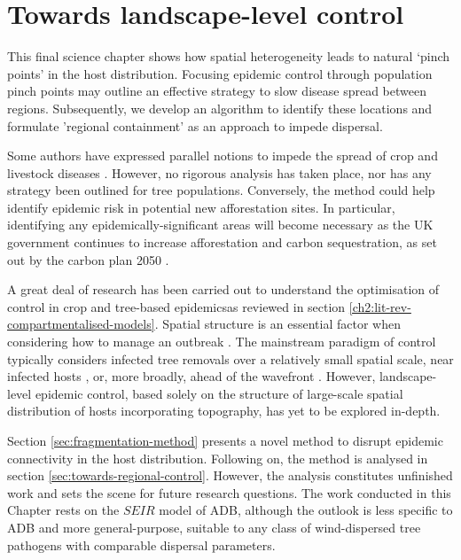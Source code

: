 
\chapter{Towards landscape-level control}

\label{ch7:landscape-level-control}

This final science chapter shows how spatial heterogeneity leads to natural `pinch points' in the host distribution. Focusing epidemic control through population pinch points may outline an effective strategy to slow disease spread between regions. Subsequently, we develop an algorithm to identify these locations and formulate 'regional containment' as an approach to impede dispersal.

Some authors have expressed parallel notions to impede the spread of crop and livestock diseases \cite{PAPAIX201435, GILIOLI20131, Gilligan-disease-management}. However, no rigorous analysis has taken place, nor has any strategy been outlined for tree populations. Conversely, the method could help identify epidemic risk in potential new afforestation sites. In particular, identifying any epidemically-significant areas will become necessary as the UK government continues to increase afforestation and carbon sequestration, as set out by the carbon plan 2050 \cite{tol2021europe, konadu2015land}.

A great deal of research has been carried out to understand the optimisation of control in crop and tree-based epidemics\textemdash as reviewed in section \ref{ch2:lit-rev-compartmentalised-models}. 
Spatial structure is an essential factor when considering how to manage an outbreak \cite{spatial-control-optimisation, control-heterogeneous-landscapes}. 
The mainstream paradigm of control typically considers infected tree removals over a relatively small spatial scale, near infected hosts \cite{WEBIDEMICS}, or, more broadly, ahead of the wavefront \cite{large-scale-control}. 
However, landscape-level epidemic control, based solely on the structure of large-scale spatial distribution of hosts incorporating topography, has yet to be explored in-depth.

Section \ref{sec:fragmentation-method} presents a novel method to disrupt epidemic connectivity in the host distribution. Following on, the method is analysed in section \ref{sec:towards-regional-control}. However, the analysis constitutes unfinished work and sets the scene for future research questions. The work conducted in this Chapter rests on the $SEIR$ model of ADB, although the outlook is less specific to ADB and more general-purpose, suitable to any class of wind-dispersed tree pathogens with comparable dispersal parameters. 

